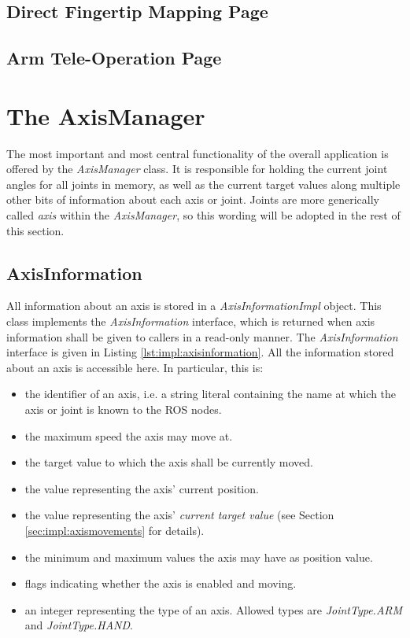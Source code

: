 \subsection{Direct Fingertip Mapping Page}

\subsection{Arm Tele-Operation Page}
\label{sec:impl:armteleop}

\section{The AxisManager}

The most important and most central functionality of the overall application is offered by the \textit{AxisManager} class. It is responsible for holding the current joint angles for all joints in memory, as well as the current target values along multiple other bits of information about each axis or joint. Joints are more generically called \textit{axis} within the \textit{AxisManager}, so this wording will be adopted in the rest of this section.

\subsection{AxisInformation}

All information about an axis is stored in a \textit{AxisInformationImpl} object. This class implements the \textit{AxisInformation} interface, which is returned when axis information shall be given to callers in a read-only manner. The \textit{AxisInformation} interface is given in Listing \ref{lst:impl:axisinformation}. All the information stored about an axis is accessible here. In particular, this is: 
\begin{itemize}
	\item the identifier of an axis, i.e. a string literal containing the name at which the axis or joint is known to the ROS nodes.
	\item the maximum speed the axis may move at.
	\item the target value to which the axis shall be currently moved.
	\item the value representing the axis' current position.
	\item the value representing the axis' \textit{current target value} (see Section \ref{sec:impl:axismovements} for details).
	\item the minimum and maximum values the axis may have as position value.
	\item flags indicating whether the axis is enabled and moving.
	\item an integer representing the type of an axis. Allowed types are \textit{JointType.ARM} and \textit{JointType.HAND}.
\end{itemize}

